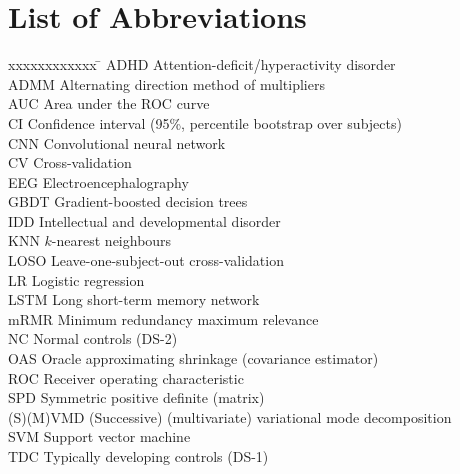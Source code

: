 \documentclass[12pt, a4paper, oneside]{report}
\begin{document}
\chapter*{List of Abbreviations}
\begin{tabbing}
xxxxxxxxxxxx \= \kill
ADHD \> Attention-deficit/hyperactivity disorder\\
ADMM \> Alternating direction method of multipliers\\
AUC \> Area under the ROC curve\\
CI \> Confidence interval (95\%, percentile bootstrap over subjects)\\
CNN \> Convolutional neural network\\
CV \> Cross-validation\\
EEG \> Electroencephalography\\
GBDT \> Gradient-boosted decision trees\\
IDD \> Intellectual and developmental disorder\\
KNN \> $k$-nearest neighbours\\
LOSO \> Leave-one-subject-out cross-validation\\
LR \> Logistic regression\\
LSTM \> Long short-term memory network\\
mRMR \> Minimum redundancy maximum relevance\\
NC \> Normal controls (DS-2)\\
OAS \> Oracle approximating shrinkage (covariance estimator)\\
ROC \> Receiver operating characteristic\\
SPD \> Symmetric positive definite (matrix)\\
(S)(M)VMD \> (Successive) (multivariate) variational mode decomposition\\
SVM \> Support vector machine\\
TDC \> Typically developing controls (DS-1)\\
\end{tabbing}

\newpage
{}
\setcounter{page}{1}









\newpage
{}


\appendix

\end{document}
